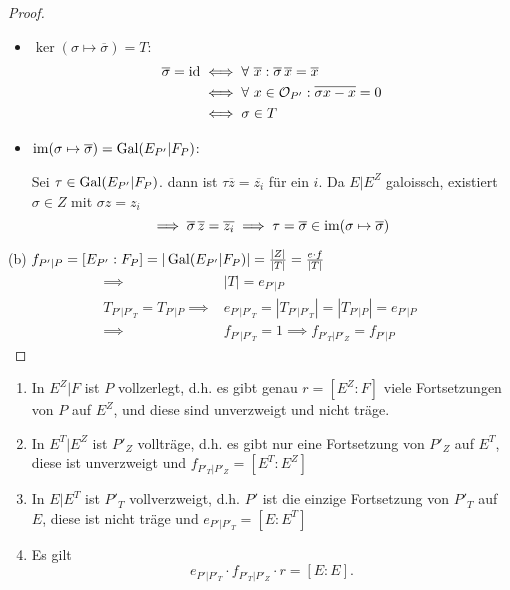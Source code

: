 \begin{proof}
\begin{itemize}
        \item $\ker (\sigma \mapsto \overline{\sigma}) = T$:
        \begin{align*}
            \overline{\sigma} = \operatorname{id} & \iff \forall~\overline{x}: \overline{\sigma}\,\overline{x} = \overline{x}\\
            & \iff \forall~x \in \mathcal{O}_{P'}: \overline{\sigma x - x} = 0\\
            & \iff \sigma \in T
        \end{align*}

        \item $\operatorname{im} (\sigma \mapsto \overline{\sigma}) = \operatorname{Gal}(E_{P'}|F_P)$:
        
        Sei $\tau \in \operatorname{Gal}(E_{P'}|F_P)$. dann ist $\tau \overline{z} = \overline{z_i}$ für ein $i$. Da $E|E^Z$ galoissch, existiert 
        $\sigma \in Z$ mit $\sigma z = z_i$ 
        $$ \implies \overline{\sigma}\, \overline{z} = \overline{z_i} \implies \tau = \overline{\sigma} \in \operatorname{im} (\sigma \mapsto \overline{\sigma})$$
    \end{itemize}

    (b) $f_{P'|P} = [E_{P'}:F_P] = |\operatorname{Gal}(E_{P'}|F_P)| = \frac{|Z|}{|T|} = \frac{e \cdot f}{|T|}$
    \begin{align*}
        \implies & |T| = e_{P'|P}\\
        T_{P'|P'_T} = T_{P'|P} \implies & e_{P'|P'_T} = |T_{P'|P'_T}| = |T_{P'|P}| = e_{P'|P}\\
        \implies & f_{P'|P'_T} = 1 \implies f_{P'_T|P'_Z} = f_{P'|P}
    \end{align*}
    \end{proof}

    \begin{korollar}
        \begin{enumerate}[label=(\alph*)]
            \item In $E^Z|F$ ist $P$ vollzerlegt, d.h. es gibt genau $r = [E^Z:F]$ viele Fortsetzungen von $P$ auf $E^Z$, und diese
            sind unverzweigt und nicht träge.

            \item In $E^T|E^Z$ ist $P'_Z$ vollträge, d.h. es gibt nur eine Fortsetzung von $P'_Z$ auf $E^T$, diese ist unverzweigt
            und $f_{P'_T|P'_Z} = [E^T:E^Z]$

            \item In $E|E^T$ ist $P'_T$ vollverzweigt, d.h. $P'$ ist die einzige Fortsetzung von $P'_T$ auf $E$, diese ist
            nicht träge und $e_{P'|P'_T} = [E:E^T]$

            \item Es gilt $$e_{P'|P'_T}\cdot f_{P'_T|P'_Z} \cdot r = [E:E].$$
        \end{enumerate}
    \end{korollar}